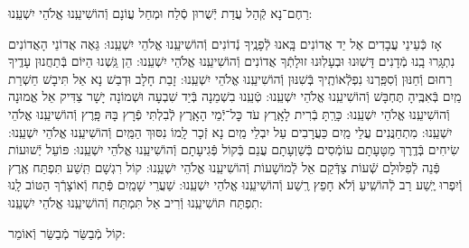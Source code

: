 \documentclass[twoside, openany, parskip=half, 11pt]{book}
\begin{document}
\shatzvkahal
רַחֶם־נָא קְֿהַל עֲדַת יְֿשֻׁרוּן סְֿלַח וּמְחַל עֲוֹנָם וְֿהוֹשִׁיעֵֽנוּ אֱלֹהֵי יִשְׁעֵֽנוּ:

\begin{small}
אָז כְּֿעֵינֵי עֲבָדִים אֶל יַד אֲדוֹנִים בָּֽאנוּ לְֿפָנֶֽיךָ נְֿדוֹנִים וְֿהוֹשִׁיעֵֽנוּ אֱלֹהֵי יִשְׁעֵֽנוּ:
גֵּאֶה אֲדוֹנֵי הָאֲדוֹנִים נִתְגָּֽרוּ בָֽנוּ מְֿדָנִים דָּשֽׁוּנוּ וּבְעָלֽוּנוּ זוּלָתְֿךָ אֲדוֹנִים וְֿהוֹשִׁיעֵֽנוּ אֱלֹהֵי יִשְׁעֵֽנוּ:
הֵן גַּֽשְׁנוּ הַיּוֹם בְּֿתַחֲנוּן עָדֶֽיךָ רַחוּם וְֿחַנּוּן וְֿסִפַּֽרְנוּ נִפְלְֿאוֹתֶֽיךָ בְּֿשִׁנּוּן וְֿהוֹשִׁיעֵֽנוּ אֱלֹהֵי יִשְׁעֵֽנוּ:
זָבַת חָלָב וּדְבַשׁ נָא אַל תִּיבָשׁ חַשְׁרַת מַֽיִם בְּֿאִבֶּֽיהָ תֶּחְבָּשׁ וְֿהוֹשִׁיעֵֽנוּ אֱלֹהֵי יִשְׁעֵֽנוּ:
טְֿעֵֽנוּ בִשְׁמֵנָה בְּֿיַד שִׁבְעָה וּשְׁמוֹנָה יָשָׁר צַדִּיק אֵל אֱמוּנָה וְֿהוֹשִׁיעֵֽנוּ אֱלֹהֵי יִשְׁעֵֽנוּ:
כָּרַֽתָּ בְֿרִית לָאָֽרֶץ עֹד כׇּל־יְֿמֵי הָאָֽרֶץ לְֿבִלְתִּי פְֿרָץ בָּהּ פָּֽרֶץ וְֿהוֹשִׁיעֵֽנוּ אֱלֹהֵי יִשְׁעֵֽנוּ:
מִתְחַנֲּנִים עֲלֵי מַֽיִם כַּעֲרָבִים עַל יִבְלֵי מַֽיִם נָא זְֿכָר לָֽמוֹ נִסּוּךְ הַמַּֽיִם וְֿהוֹשִׁיעֵֽנוּ אֱלֹהֵי יִשְׁעֵֽנוּ:
שִׂיחִים בְּֿדֶֽרֶךְ מַטָּעָתָם עוֹמְֿסִים בְּֿשַׁוְעָתָם עֲנֵם בְּֿקוֹל פְּֿגִיעָתָם וְֿהוֹשִׁיעֵֽנוּ אֱלֹהֵי יִשְׁעֵֽנוּ:
פּוֹעֵל יְֿשׁוּעוֹת פְּֿנֵה לְֿפִלּוּלָם שְֿׁעוֹת צַדְּֿקֵם אֵל לְֿמוֹשָׁעוֹת וְֿהוֹשִׁיעֵֽנוּ אֱלֹהֵי יִשְׁעֵֽנוּ:
קוֹל רִגְשָׁם תִּֽשַׁע תִּפְתַּח אֶֽרֶץ וְֿיִפְרוּ יֶֽשַׁע רַב לְֿהוֹשִֽׁיעַ וְֿלֹא חָפֵץ רֶֽשַׁע וְֿהוֹשִׁיעֵֽנוּ אֱלֹהֵי יִשְׁעֵֽנוּ:
שַׁעֲרֵי שָׁמַֽיִם פְּֿתַח וְֿאוֹצָרְֿךָ הַטּוֹב לָֽנוּ תִפְתַּח תּוֹשִׁיעֵֽנוּ וְֿרִיב אַל תִּמְתַּח וְֿהוֹשִׁיעֵֽנוּ אֱלֹהֵי יִשְׁעֵֽנוּ:

\end{small}

\begin{large}
קוֹל מְֿבַשֵּׂר מְֿבַשֵּׂר וְֿאוֹמֵר:

\end{large}
\end{document}
